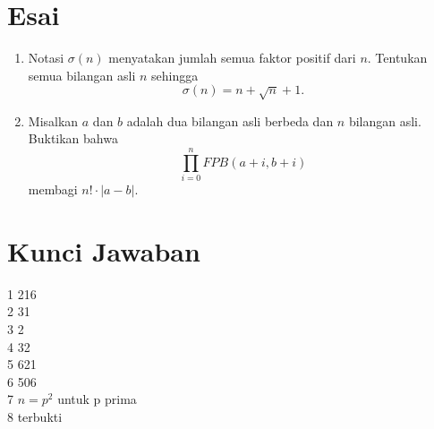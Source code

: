 \documentclass[12pt]{scrartcl}
\begin{document}
\section{Esai}

\begin{enumerate}[resume]

	\item Notasi $\sigma(n)$ menyatakan jumlah semua faktor positif dari $n$.
	Tentukan semua bilangan asli $n$ sehingga
	\[ \sigma(n) = n + \sqrt{n} + 1. \]

	\item Misalkan $a$ dan $b$ adalah dua bilangan asli berbeda
	dan $n$ bilangan asli. Buktikan bahwa
	\[ \prod_{i=0}^{n} FPB(a+i, b+i) \]
	membagi $n! \cdot |a - b|$.

\end{enumerate}

\section{Kunci Jawaban}
1 216\\
2 31\\
3 2\\
4 32\\
5 621\\
6 506\\
7 $n = p^2$ untuk p prima\\
8 terbukti
\end{document}
